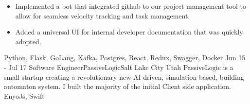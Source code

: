 \begin{experiences}
{\begin{itemize}
                        \item Implemented a bot that integrated github to our project management tool to allow for seamless velocity tracking and task management.
                        \item Added a universal UI for internal developer documentation that was quickly adopted.
                      \end{itemize}
                    }
                    {Python, Flask, GoLang, Kafka, Postgres, React, Redux, Swagger, Docker}
  \emptySeparator
  \experience
  {Jun 15 - Jul 17}  {Software Engineer}{PassiveLogic}{Salt Lake City Utah}
  {}  {PassiveLogic is a small startup creating a revolutionary new AI driven, simulation based, building automaton system. I built the majority of the initial Client side application.}
      {EnyoJs, Swift}
  \emptySeparator
\end{experiences}
